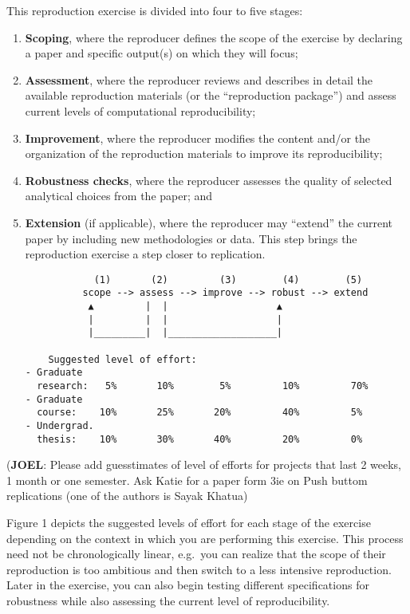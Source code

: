 \documentclass[]{book}
\begin{document}
This reproduction exercise is divided into four to five stages:

\begin{enumerate}
\def\labelenumi{\arabic{enumi}.}
\item
  \textbf{Scoping}, where the reproducer defines the scope of the exercise by declaring a paper and specific output(s) on which they will focus;\\
\item
  \textbf{Assessment}, where the reproducer reviews and describes in detail the available reproduction materials (or the ``reproduction package'') and assess current levels of computational reproducibility;\\
\item
  \textbf{Improvement}, where the reproducer modifies the content and/or the organization of the reproduction materials to improve its reproducibility;\\
\item
  \textbf{Robustness checks}, where the reproducer assesses the quality of selected analytical choices from the paper; and\\
\item
  \textbf{Extension} (if applicable), where the reproducer may ``extend'' the current paper by including new methodologies or data. This step brings the reproduction exercise a step closer to replication.

\begin{verbatim}
            (1)       (2)         (3)        (4)        (5)
          scope --> assess --> improve --> robust --> extend
           ▲         |  |                   ▲
           |         |  |                   |
           |_________|  |___________________|

    Suggested level of effort:
- Graduate
  research:   5%       10%        5%         10%         70%
- Graduate
  course:    10%       25%       20%         40%         5%
- Undergrad.
  thesis:    10%       30%       40%         20%         0%
\end{verbatim}
\end{enumerate}

(\textbf{JOEL}: Please add guesstimates of level of efforts for projects that last 2 weeks, 1 month or one semester. Ask Katie for a paper form 3ie on Push buttom replications (one of the authors is Sayak Khatua)

Figure 1 depicts the suggested levels of effort for each stage of the exercise depending on the context in which you are performing this exercise. This process need not be chronologically linear, e.g.~you can realize that the scope of their reproduction is too ambitious and then switch to a less intensive reproduction. Later in the exercise, you can also begin testing different specifications for robustness while also assessing the current level of reproducibility.
\end{document}
